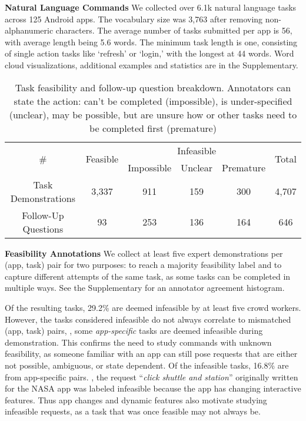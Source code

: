 \smallskip

\noindent\textbf{Natural Language Commands}
We collected over 6.1k natural language tasks across 125 Android apps. 
The vocabulary size was 3,763 after removing non-alphanumeric characters. %
The average number of tasks submitted per app is 56, with average length being 5.6 words. The minimum task length is one, consisting of single action tasks like `refresh' or `login,' with the longest at 44 words. 
Word cloud visualizations, additional examples and statistics are in the Supplementary. %
\begin{table}[t]
    \centering
      \renewcommand\arraystretch{0.95}
        \caption{Task feasibility and follow-up question breakdown. Annotators can state the action: can't be completed (impossible), is under-specified (unclear), may be possible, but are unsure how or other tasks need to be completed first (premature)}
    \begin{tabular}{|c|c|c|c|c|c|}
    \hline
      \multirow{2}{*}{\#} & \multirow{2}{*}{Feasible}  &  \multicolumn{3}{c|}{Infeasible} & \multirow{2}{*}{Total} \\
      \cline{3-5}
      & & Impossible & Unclear & Premature & \\
      \hline
     Task Demonstrations & 3,337 & 911 & 159 & 300 & 4,707 \\ %
      \hline
      Follow-Up Questions & 93 & 253 & 136 & 164 & 646 \\ %
      \hline
    \end{tabular}
    \label{tab:possible}
\end{table}
\smallskip

\noindent\textbf{Feasibility Annotations}
We collect at least five expert demonstrations per (app, task) pair for two purposes: to reach a majority feasibility label and to capture different attempts of the same task, as some tasks can be completed in multiple ways. See the Supplementary for an annotator agreement histogram.

Of the resulting tasks, 29.2\% are deemed infeasible by at least five crowd workers. 
However, the tasks considered infeasible do not always correlate to mismatched (app, task) pairs, \ie, some 
\textit{app-specific} tasks are deemed infeasible during demonstration. This confirms the need to study commands with unknown feasibility, as someone familiar with an app can still pose requests that are either not possible, ambiguous, or state dependent. Of the infeasible tasks, 16.8\% are from app-specific pairs. %
\Eg, the request ``\textit{click shuttle and station}'' originally written for the NASA app was labeled infeasible because the app has changing interactive features. Thus app changes and dynamic features also motivate studying infeasible requests, as a task that was once feasible may not always be.


